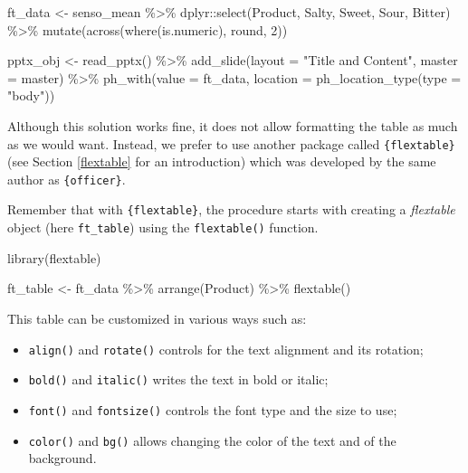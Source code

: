 \documentclass[
]{krantz}
\makeatletter
\newenvironment{Shaded}{\begin{snugshade}}{\end{snugshade}}
\newcommand{\AttributeTok}[1]{\textcolor[rgb]{0.61,0.61,0.61}{#1}}
\newcommand{\DecValTok}[1]{\textcolor[rgb]{0.06,0.06,0.06}{#1}}
\newcommand{\FunctionTok}[1]{\textcolor[rgb]{0,0,0}{#1}}
\newcommand{\NormalTok}[1]{#1}
\newcommand{\OtherTok}[1]{\textcolor[rgb]{0.37,0.37,0.37}{#1}}
\newcommand{\SpecialCharTok}[1]{\textcolor[rgb]{0,0,0}{#1}}
\newcommand{\StringTok}[1]{\textcolor[rgb]{0.5,0.5,0.5}{#1}}
\providecommand{\tightlist}{%
  \setlength{\itemsep}{0pt}\setlength{\parskip}{0pt}}
\newenvironment{kframe}{%
\medskip{}
\setlength{\fboxsep}{.8em}
 \def\at@end@of@kframe{}%
 \ifinner\ifhmode%
  \def\at@end@of@kframe{\end{minipage}}%
  \begin{minipage}{\columnwidth}%
 \fi\fi%
 \def\FrameCommand##1{\hskip\@totalleftmargin \hskip-\fboxsep
 \colorbox{shadecolor}{##1}\hskip-\fboxsep
     \hskip-\linewidth \hskip-\@totalleftmargin \hskip\columnwidth}%
 \MakeFramed {\advance\hsize-\width
   \@totalleftmargin\z@ \linewidth\hsize
   \@setminipage}}%
 {\par\unskip\endMakeFramed%
 \at@end@of@kframe}
\renewenvironment{Shaded}{\begin{kframe}}{\end{kframe}}
\makeatother
\begin{document}
\begin{Shaded}
\begin{Highlighting}[]
\NormalTok{ft\_data }\OtherTok{\textless{}{-}}\NormalTok{ senso\_mean }\SpecialCharTok{\%\textgreater{}\%}
\NormalTok{  dplyr}\SpecialCharTok{::}\FunctionTok{select}\NormalTok{(Product, Salty, Sweet, Sour, Bitter) }\SpecialCharTok{\%\textgreater{}\%} 
  \FunctionTok{mutate}\NormalTok{(}\FunctionTok{across}\NormalTok{(}\FunctionTok{where}\NormalTok{(is.numeric), round, }\DecValTok{2}\NormalTok{)) }

\NormalTok{pptx\_obj }\OtherTok{\textless{}{-}} \FunctionTok{read\_pptx}\NormalTok{() }\SpecialCharTok{\%\textgreater{}\%}
  \FunctionTok{add\_slide}\NormalTok{(}\AttributeTok{layout =} \StringTok{"Title and Content"}\NormalTok{, }\AttributeTok{master =}\NormalTok{ master) }\SpecialCharTok{\%\textgreater{}\%}
  \FunctionTok{ph\_with}\NormalTok{(}\AttributeTok{value =}\NormalTok{ ft\_data, }\AttributeTok{location =} \FunctionTok{ph\_location\_type}\NormalTok{(}\AttributeTok{type =} \StringTok{"body"}\NormalTok{))}
\end{Highlighting}
\end{Shaded}

Although this solution works fine, it does not allow formatting the table as much as we would want. Instead, we prefer to use another package called \texttt{\{flextable\}} (see Section \ref{flextable} for an introduction) which was developed by the same author as \texttt{\{officer\}}.

Remember that with \texttt{\{flextable\}}, the procedure starts with creating a \emph{flextable} object (here \texttt{ft\_table}) using the \texttt{flextable()} function.

\begin{Shaded}
\begin{Highlighting}[]
\FunctionTok{library}\NormalTok{(flextable)}

\NormalTok{ft\_table }\OtherTok{\textless{}{-}}\NormalTok{ ft\_data }\SpecialCharTok{\%\textgreater{}\%} 
  \FunctionTok{arrange}\NormalTok{(Product) }\SpecialCharTok{\%\textgreater{}\%} 
  \FunctionTok{flextable}\NormalTok{()}
\end{Highlighting}
\end{Shaded}

This table can be customized in various ways such as:

\begin{itemize}
\tightlist
\item
  \texttt{align()} and \texttt{rotate()} controls for the text alignment and its rotation;
\item
  \texttt{bold()} and \texttt{italic()} writes the text in bold or italic;
\item
  \texttt{font()} and \texttt{fontsize()} controls the font type and the size to use;
\item
  \texttt{color()} and \texttt{bg()} allows changing the color of the text and of the background.
\end{itemize}
\end{document}
